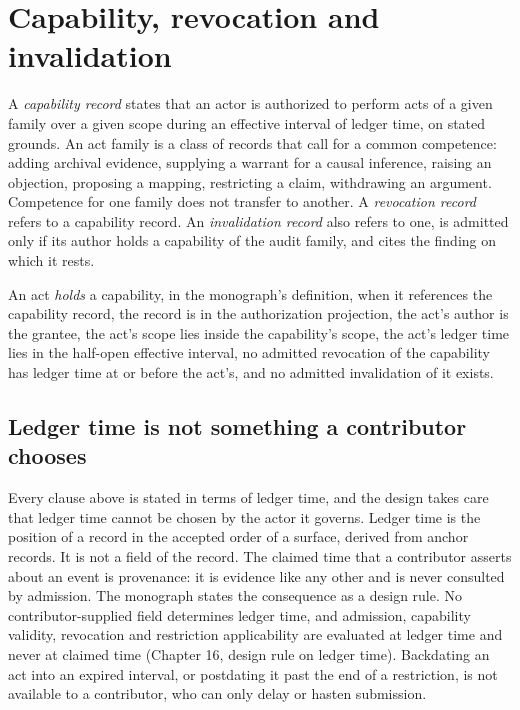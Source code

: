 \documentclass[11pt]{article}
\begin{document}
\section{Capability, revocation and invalidation}\label{sec:cap}

A \emph{capability record} states that an actor is authorized to perform acts of a given family over a given scope during an effective interval of ledger time, on stated grounds. An act family is a class of records that call for a common competence: adding archival evidence, supplying a warrant for a causal inference, raising an objection, proposing a mapping, restricting a claim, withdrawing an argument. Competence for one family does not transfer to another. A \emph{revocation record} refers to a capability record. An \emph{invalidation record} also refers to one, is admitted only if its author holds a capability of the audit family, and cites the finding on which it rests.

An act \emph{holds} a capability, in the monograph's definition, when it references the capability record, the record is in the authorization projection, the act's author is the grantee, the act's scope lies inside the capability's scope, the act's ledger time lies in the half-open effective interval, no admitted revocation of the capability has ledger time at or before the act's, and no admitted invalidation of it exists.

\subsection{Ledger time is not something a contributor chooses}

Every clause above is stated in terms of ledger time, and the design takes care that ledger time cannot be chosen by the actor it governs. Ledger time is the position of a record in the accepted order of a surface, derived from anchor records. It is not a field of the record. The claimed time that a contributor asserts about an event is provenance: it is evidence like any other and is never consulted by admission. The monograph states the consequence as a design rule. No contributor-supplied field determines ledger time, and admission, capability validity, revocation and restriction applicability are evaluated at ledger time and never at claimed time (Chapter 16, design rule on ledger time). Backdating an act into an expired interval, or postdating it past the end of a restriction, is not available to a contributor, who can only delay or hasten submission.
\end{document}
